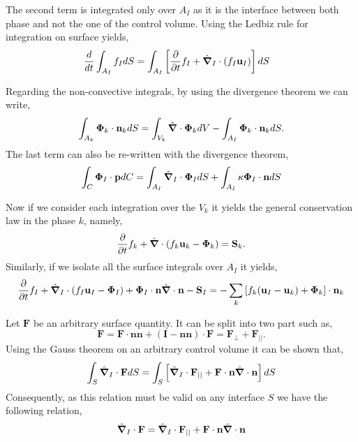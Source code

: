 The second term is integrated only over $A_I$ as it is the interface between both phase and not the one of the control volume. 
Using the Ledbiz rule for integration on surface yields, 
\begin{align*}
    \frac{d}{d t} \int_{A_I} f_I dS 
    &= \int_{A_I} \left[
        \frac{\partial}{\partial t} f_I  + \hat{\bm{\nabla}}_I \cdot (f_I \textbf{u}_I) 
    \right]dS
\end{align*}

Regarding the non-convective integrals, by using the divergence theorem we can write, 
\begin{align*}
    \int_{A_k} \mathbf{\Phi}_k\cdot \textbf{n}_k dS
    = \int_{V_k} \hat{\bm{\nabla}}\cdot\mathbf{\Phi}_k dV
    - \int_{A_I} \mathbf{\Phi}_k\cdot \textbf{n}_k dS. 
\end{align*}
The last term can also be re-written with the divergence theorem,
\begin{align*}
    \int_{C} \mathbf{\Phi}_I\cdot \textbf{p} dC 
    = \int_{A_I} \hat{\bm{\nabla}}_I \cdot \mathbf{\Phi}_I dS
    + \int_{A_I} \kappa \mathbf{\Phi}_I \cdot \textbf{n} dS
\end{align*}

Now if we consider each integration over the $V_k$ it yields the general conservation law in the phase $k$, namely, 
\begin{equation*}
    \frac{\partial}{\partial t} f_k  
    + \hat{\bm{\nabla}} \cdot (f_k \textbf{u}_k - \mathbf{\Phi}_k) 
    =\textbf{S}_k. 
\end{equation*}
Similarly, if we isolate all the surface integrals over $A_I$ it yields,
\begin{equation}
    \frac{\partial}{\partial t} f_I  
    + \hat{\bm{\nabla}}_I \cdot (f_I \textbf{u}_I -\mathbf{\Phi}_I)
    + \mathbf{\Phi}_I \cdot \textbf{n} \hat{\bm{\nabla}} \cdot \textbf{n}
    - \textbf{S}_I
    = 
    - \sum_k \left[
    f_k (\textbf{u}_I - \textbf{u}_k)
    + \mathbf{\Phi}_k
    \right] \cdot \textbf{n}_k 
    \label{ap:eq:dt_f_I}
\end{equation}

Let $\textbf{F}$ be an arbitrary surface quantity. 
It can be split into two part such as, 
\begin{equation*}
    \textbf{F} 
    = \textbf{F} \cdot \textbf{n}\textbf{n}
    + (\textbf{I} - \textbf{nn})  \cdot \textbf{F}
    = \textbf{F}_\bot + \textbf{F}_{||}.
\end{equation*}
Using the Gauss theorem on an arbitrary control volume it can be shown that, 
\begin{equation*}
    \int_{S} \hat{\bm{\nabla}}_I \cdot \textbf{F}dS
    = 
    \int_{S} \left[\hat{\bm{\nabla}}_I \cdot \textbf{F}_{||} 
    + \textbf{F} \cdot \textbf{n} \hat{\bm{\nabla}}\cdot\textbf{n}
    \right]dS
\end{equation*}
Consequently, as this relation must be valid on any interface $S$ we have the following relation,
\begin{equation}
    \hat{\bm{\nabla}}_I \cdot \textbf{F}
    = 
    \hat{\bm{\nabla}}_I \cdot \textbf{F}_{||} 
    + \textbf{F} \cdot \textbf{n} \hat{\bm{\nabla}}\cdot\textbf{n}
    \label{ap:eq:nabla_I_F}
\end{equation}

